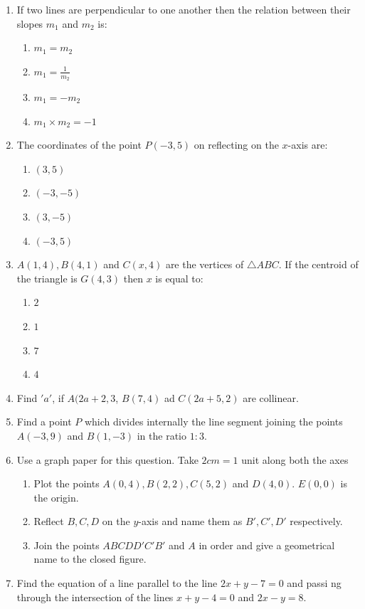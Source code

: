 \begin{enumerate}
	\item If two lines are perpendicular to one another then the relation between their slopes $m_{1}$ and $m_{2}$ is:
		\begin{enumerate}
			\item $m_{1} = m_{2}$
			\item $m_{1} = \frac{1}{m_{2}}$
			\item $m_{1} = -m_{2}$
			\item $m_{1} \times m_{2} = -1$
		\end{enumerate}
	\item The coordinates of the point $P(-3,5)$ on reflecting on the $x$-axis are:
		\begin{enumerate}
			\item $(3, 5)$
			\item $(-3, -5)$
			\item $(3, -5)$
			\item $(-3, 5)$
		\end{enumerate}
	\item $A(1, 4), B(4, 1)$ and $C(x, 4)$ are the vertices of $\bigtriangleup ABC$. If the centroid of the triangle is $G(4, 3)$ then $x$ is equal to:
		\begin{enumerate}
			\item $2$
			\item $1$
			\item $7$
			\item $4$
		\end{enumerate}
	\item Find $'a'$, if $A(2a + 2, 3$, $B(7,4)$ ad $C(2a +5, 2)$ are collinear.
	\item Find a point $P$ which divides internally the line segment joining the points $A(-3, 9)$ and $B(1, -3)$ in the ratio $1:3$.
	\item Use a graph paper for this question. Take $2 cm = 1$ unit along both the axes\\
		\begin{enumerate}
			\item Plot the points $A(0, 4), B(2, 2), C(5,2)$ and $D(4,0)$. $E(0, 0)$ is the origin.
			\item Reflect $B, C, D$ on the $y$-axis and name them as $B', C', D'$ respectively.
			\item Join the points $ABCDD'C'B'$ and $A$ in order and give a geometrical name to the closed figure.
		\end{enumerate}
	\item Find the equation of a line parallel to the line $2x + y - 7 = 0$ and passi    ng through the intersection of the lines $x + y- 4 =0$ and $2x - y =8$.

\end{enumerate}
